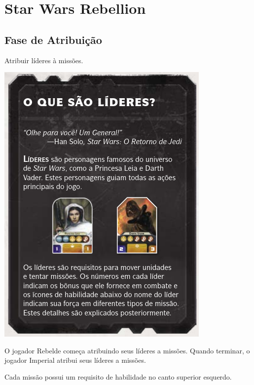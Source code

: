 \documentclass[11pt]{article}
\author{Fabio Favero Henkes}
\date{\today}
\title{}
\begin{document}
\tableofcontents

\section{Star Wars Rebellion}
\label{sec:org581f4e6}

\subsection{Fase de Atribuição}
\label{sec:orgca3ad51}

Atribuir líderes à missões.

\begin{center}
\includegraphics[width=.9\linewidth]{./lider.png}
\end{center}

O jogador Rebelde começa atribuindo seus líderes a missões. Quando terminar, o jogador Imperial atribui seus líderes a missões.

Cada missão possui um requisito de habilidade no canto superior esquerdo.
\end{document}
